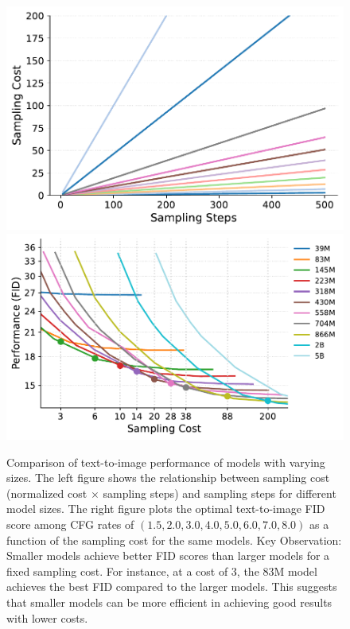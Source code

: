 \begin{figure}[!t]
    \centering 
    \def\xwidth{.3\linewidth}
    \includegraphics[height=\xwidth]{cp2/figures/analyze_inference_steps_costs.pdf}
    \includegraphics[height=\xwidth]{cp2/figures/analyze_inference_costs.pdf}
    \caption{%
    Comparison of text-to-image performance of models with varying sizes. The left figure shows the relationship between sampling cost (normalized cost $\times$ sampling steps) and sampling steps for different model sizes. The right figure plots the optimal text-to-image FID score among CFG rates of $(1.5, 2.0, 3.0, 4.0, 5.0, 6.0, 7.0, 8.0)$ as a function of the sampling cost for the same models.
    Key Observation: Smaller models achieve better FID scores than larger models for a fixed sampling cost. For instance, at a cost of 3, the 83M model achieves the best FID compared to the larger models. This suggests that smaller models can be more efficient in achieving good results with lower costs.
    }
    \label{fig:optiamlrules}
\end{figure}


